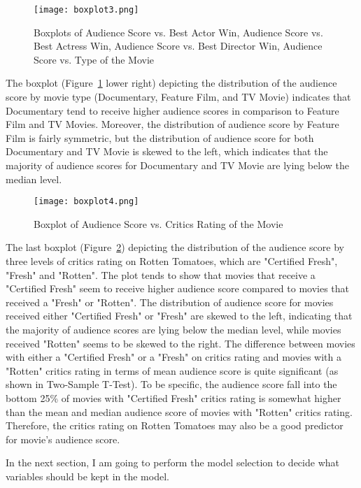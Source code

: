 \begin{figure}[htbp]
\begin{center}
\caption{Boxplots of Audience Score vs. Best Actor Win, Audience Score vs. Best Actress Win, Audience Score vs. Best Director Win, Audience Score vs. Type of the Movie}
\texttt{[image: boxplot3.png]}
\label{fig: 9}
\end{center}
\end{figure}

The boxplot (Figure~\ref{fig: 9} lower right) depicting the distribution of the audience score by movie type (Documentary, Feature Film, and TV Movie) indicates that Documentary tend to receive higher audience scores in comparison to Feature Film and TV Movies. Moreover, the distribution of audience score by Feature Film is fairly symmetric, but the distribution of audience score for both Documentary and TV Movie is skewed to the left, which indicates that the majority of audience scores for Documentary and TV Movie are lying below the median level. 

\begin{figure}[htbp]
\begin{center}
\caption{Boxplot of Audience Score vs. Critics Rating of the Movie}
\texttt{[image: boxplot4.png]}
\label{fig: 10}
\end{center}
\end{figure}

The last boxplot (Figure~\ref{fig: 10}) depicting the distribution of the audience score by three levels of critics rating on Rotten Tomatoes, which are "Certified Fresh", "Fresh" and "Rotten". The plot tends to show that movies that receive a "Certified Fresh" seem to receive higher audience score compared to movies that received a "Fresh" or "Rotten". The distribution of audience score for movies received either "Certified Fresh" or "Fresh" are skewed to the left, indicating that the majority of audience scores are lying below the median level, while movies received "Rotten" seems to be skewed to the right. The difference between movies with either a "Certified Fresh" or a "Fresh" on critics rating and movies with a "Rotten" critics rating in terms of mean audience score is quite significant (as shown in Two-Sample T-Test). To be specific, the audience score fall into the bottom 25\% of movies with "Certified Fresh" critics rating is somewhat higher than the mean and median audience score of movies with "Rotten" critics rating. Therefore, the critics rating on Rotten Tomatoes may also be a good predictor for movie's audience score.

In the next section, I am going to perform the model selection to decide what variables should be kept in the model.

